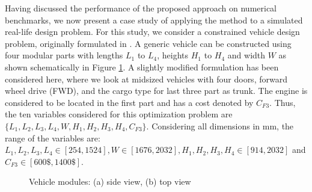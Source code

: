 \documentclass[twocolumn,10pt]{asme2ej}
\begin{document}
Having discussed the performance of the proposed approach on numerical benchmarks, we now present a case study of applying the method to a simulated real-life design problem. For this study, we consider a constrained vehicle design problem, originally formulated in \cite{KHTbarnum2010car}. A generic vehicle can be constructed using four modular parts with lengths $L_1$ to $L_4$, heights $H_1$ to $H_4$ and width $W$ as shown schematically in Figure \ref{fig:car}. A slightly modified formulation has been considered here, where we look at midsized vehicles with four doors, forward wheel drive (FWD), and the cargo type for last three part as trunk. The engine is considered to be located in the first part and has a cost denoted by $C_{F3}$. Thus, the ten variables considered for this optimization problem are $\{L_1, L_2, L_3, L_4, W, H_1, H_2, H_3, H_4, C_{F3}\}$. Considering all dimensions in mm, the range of the variables are: $L_1, L_2, L_3, L_4 \in [254,1524], W \in [1676,2032], H_1,H_2,H_3,H_4 \in [914,2032]$ and $C_{F3} \in [600\$,1400\$]$.

\begin{figure}[!htb]
	\centering    
	\caption{Vehicle modules: (a) side view, (b) top view}
	\label{fig:car}
\end{figure}
\end{document}
